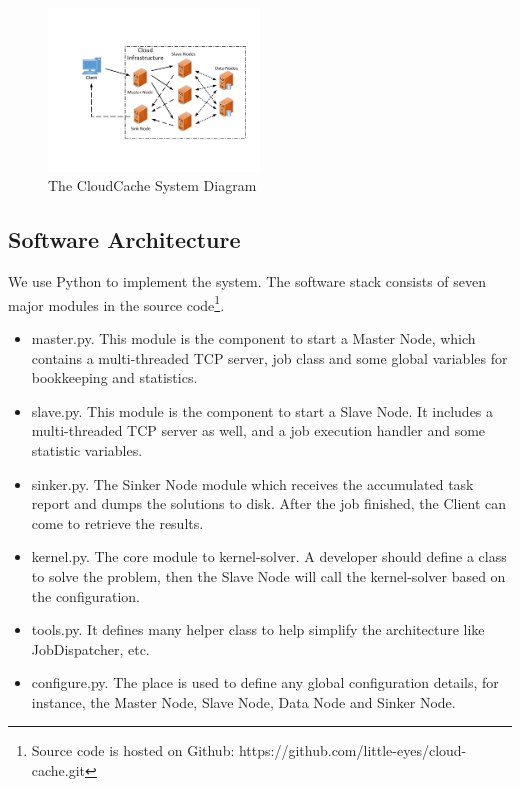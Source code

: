 \begin{figure}
\centering
\includegraphics[width=0.5\textwidth]{pics/cloud-cache-arch.pdf}
\caption{The CloudCache System Diagram}
\label{fig:system}
\end{figure}

\subsection{Software Architecture}
We use Python to implement the system. The software stack consists of seven major modules in the source code\footnote{Source code is hosted on Github: https://github.com/little-eyes/cloud-cache.git}.

\begin{itemize}
\item master.py. This module is the component to start a Master Node, which contains a multi-threaded TCP server, job class and some global variables for bookkeeping and statistics.

\item slave.py. This module is the component to start a Slave Node. It includes a multi-threaded TCP server as well, and a job execution handler and some statistic variables.
\item sinker.py. The Sinker Node module which receives the accumulated task report and dumps the solutions to disk. After the job finished, the Client can come to retrieve the results.
\item kernel.py. The core module to kernel-solver. A developer should define a class to solve the problem, then the Slave Node will call the kernel-solver based on the configuration.
\item tools.py. It defines many helper class to help simplify the architecture like JobDispatcher, etc.
\item configure.py. The place is used to define any global configuration details, for instance, the Master Node, Slave Node, Data Node and Sinker Node.
\end{itemize}

